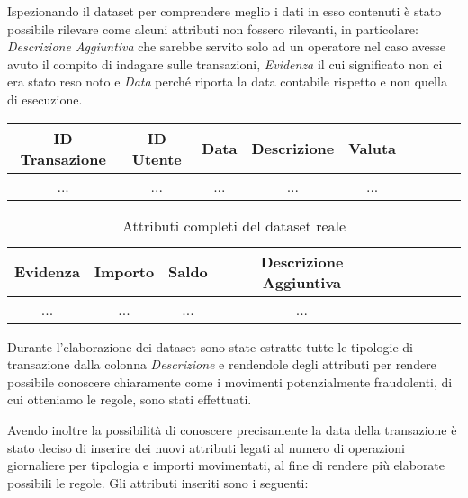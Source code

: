 Ispezionando il dataset per comprendere meglio i dati in esso contenuti è stato possibile rilevare come alcuni attributi non fossero rilevanti, in particolare: 
\textit{Descrizione Aggiuntiva} che sarebbe servito solo ad un operatore nel caso avesse avuto il compito di indagare sulle transazioni, \textit{Evidenza} il cui significato non ci era stato reso noto e \textit{Data} perché riporta la data contabile rispetto e non quella di esecuzione.\\


\begin{table}[H] %
\centering
\begin{tabular}{|c|c|c|c|c|c|c|c|c|} \hline
ID Transazione & ID Utente & Data & Descrizione & Valuta 
 \\ \hline
... & ... & ... & ... & ...\\ \hline
\end{tabular}
\label{tab:reale}
\end{table}
\begin{table}[H] %
\centering
\begin{tabular}{|c|c|c|c|c|c|c|c|c|} \hline
Evidenza & Importo & Saldo & Descrizione Aggiuntiva
 \\ \hline
... & ... & ... & ...  \\ \hline
\end{tabular}
\caption{Attributi completi del dataset reale}
\label{tab:reale}
\end{table}

Durante l'elaborazione dei dataset sono state estratte tutte le tipologie di transazione dalla colonna \textit{Descrizione} e rendendole degli attributi per rendere possibile conoscere chiaramente come i movimenti potenzialmente fraudolenti, di cui otteniamo le regole, sono stati effettuati.

Avendo inoltre la possibilità di conoscere precisamente la data della transazione è stato deciso di inserire dei nuovi attributi legati al numero di operazioni giornaliere per tipologia e importi movimentati, al fine di rendere più elaborate possibili le regole. Gli attributi inseriti sono i seguenti:

